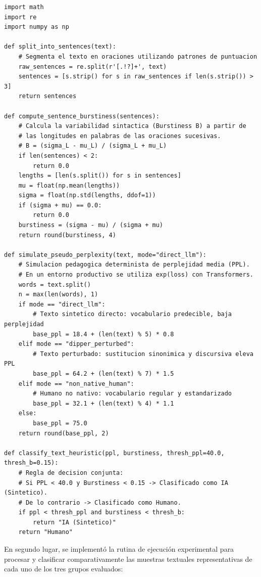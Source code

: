 \begin{tcolorbox}[colback=bg_marfil, colframe=unmsm_gold, arc=3pt, boxrule=0.6pt, top=0.25cm, bottom=0.25cm, left=0.4cm, right=0.4cm]
\footnotesize
\begin{verbatim}
import math
import re
import numpy as np

def split_into_sentences(text):
    # Segmenta el texto en oraciones utilizando patrones de puntuacion
    raw_sentences = re.split(r'[.!?]+', text)
    sentences = [s.strip() for s in raw_sentences if len(s.strip()) > 3]
    return sentences

def compute_sentence_burstiness(sentences):
    # Calcula la variabilidad sintactica (Burstiness B) a partir de 
    # las longitudes en palabras de las oraciones sucesivas.
    # B = (sigma_L - mu_L) / (sigma_L + mu_L)
    if len(sentences) < 2:
        return 0.0
    lengths = [len(s.split()) for s in sentences]
    mu = float(np.mean(lengths))
    sigma = float(np.std(lengths, ddof=1))
    if (sigma + mu) == 0.0:
        return 0.0
    burstiness = (sigma - mu) / (sigma + mu)
    return round(burstiness, 4)

def simulate_pseudo_perplexity(text, mode="direct_llm"):
    # Simulacion pedagogica determinista de perplejidad media (PPL).
    # En un entorno productivo se utiliza exp(loss) con Transformers.
    words = text.split()
    n = max(len(words), 1)
    if mode == "direct_llm":
        # Texto sintetico directo: vocabulario predecible, baja perplejidad
        base_ppl = 18.4 + (len(text) % 5) * 0.8
    elif mode == "dipper_perturbed":
        # Texto perturbado: sustitucion sinonimica y discursiva eleva PPL
        base_ppl = 64.2 + (len(text) % 7) * 1.5
    elif mode == "non_native_human":
        # Humano no nativo: vocabulario regular y estandarizado
        base_ppl = 32.1 + (len(text) % 4) * 1.1
    else:
        base_ppl = 75.0
    return round(base_ppl, 2)

def classify_text_heuristic(ppl, burstiness, thresh_ppl=40.0, thresh_b=0.15):
    # Regla de decision conjunta:
    # Si PPL < 40.0 y Burstiness < 0.15 -> Clasificado como IA (Sintetico).
    # De lo contrario -> Clasificado como Humano.
    if ppl < thresh_ppl and burstiness < thresh_b:
        return "IA (Sintetico)"
    return "Humano"
\end{verbatim}
\end{tcolorbox}

En segundo lugar, se implementó la rutina de ejecución experimental para procesar y clasificar comparativamente las muestras textuales representativas de cada uno de los tres grupos evaluados:

